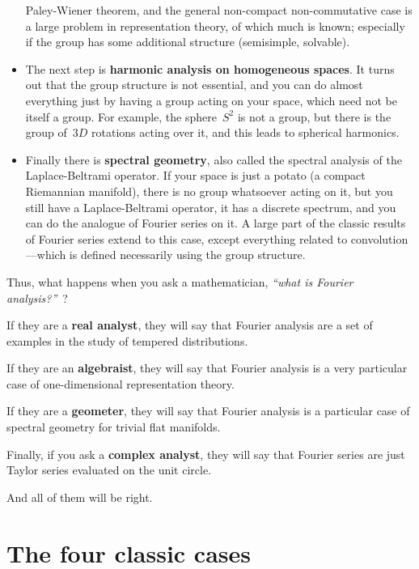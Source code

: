 \begin{itemize}
		Paley-Wiener theorem, and the general non-compact
		non-commutative case is a large problem in representation
		theory, of which much is known; especially if the group has
		some additional structure (semisimple, solvable).
	\item The next step is {\bf harmonic analysis on homogeneous
		spaces}.  It turns out that the group structure is not
		essential, and you can do almost everything just by having a
		group acting on your space, which need not be itself a group.
		For example, the sphere~$S^2$ is not a group, but there is the
		group of~$3D$ rotations acting over it, and this leads to
		spherical harmonics.
	\item Finally there is {\bf spectral geometry}, also called the
		spectral analysis of the Laplace-Beltrami operator.  If your
		space is just a potato (a compact Riemannian manifold), there
		is no group whatsoever acting on it, but you still have a
		Laplace-Beltrami operator, it has a discrete spectrum, and you
		can do the analogue of Fourier series on it.  A large part of
		the classic results of Fourier series extend to this case,
		except everything related to convolution---which is defined
		necessarily using the group structure.
\end{itemize}

Thus, what happens when you ask a mathematician, \emph{``what is
Fourier analysis?''}~?

If they are a {\bf real analyst}, they will say that Fourier analysis
are a set of examples in the study of tempered distributions.

If they are an {\bf algebraist}, they will say that Fourier analysis
is a very particular case of one-dimensional representation theory.

If they are a {\bf geometer}, they will say that Fourier analysis is
a particular case of spectral geometry for trivial flat manifolds.

Finally, if you ask a {\bf complex analyst}, they will say that
Fourier series are just Taylor series evaluated on the unit circle.

And all of them will be right.




\section{The four classic cases}

